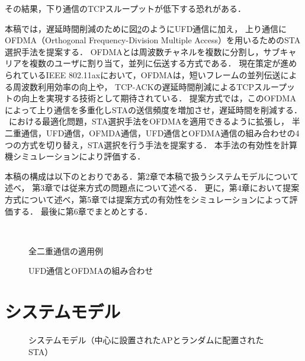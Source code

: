 \documentclass[technicalreport]{ieicej}
\begin{document}
	その結果，下り通信のTCPスループットが低下する恐れがある．
	\par
	本稿では，遅延時間削減のために図\ref{fig:ofdma}のようにUFD通信に加え，
	上り通信にOFDMA（Orthogonal Frequency-Division Multiple Access）を用いるためのSTA選択手法を提案する．
	OFDMAとは周波数チャネルを複数に分割し，サブキャリアを複数のユーザに割り当て，並列に伝送する方式である．
	現在策定が進められているIEEE 802.11axにおいて，OFDMAは，短いフレームの並列伝送による周波数利用効率の向上や，
	TCP-ACKの遅延時間削減によるTCPスループットの向上を実現する技術として期待されている．
	提案方式では，このOFDMAによって上り通信を多重化しSTAの送信頻度を増加させ，遅延時間を削減する．
	~\cite{promac_fair}における最適化問題，STA選択手法をOFDMAを適用できるように拡張し，
	半二重通信，UFD通信，OFMDA通信，UFD通信とOFDMA通信の組み合わせの4つの方式を切り替え，STA選択を行う手法を提案する．
	本手法の有効性を計算機シミュレーションにより評価する．
	\par
	本稿の構成は以下のとおりである．第2章で本稿で扱うシステムモデルについて述べ，
	第3章では従来方式の問題点について述べる．
	更に，第4章において提案方式について述べ，第5章では提案方式の有効性をシミュレーションによって評価する．
	最後に第6章でまとめとする．

	\begin{figure}[t]
		\centering
		\\
		\caption{全二重通信の適用例}
		\label{fig:topology}
	\end{figure}

	\begin{figure}[t]
		\centering
		\caption{UFD通信とOFDMAの組み合わせ}
		\label{fig:ofdma}
	\end{figure}

\section{システムモデル}\label{seq:system}
	\begin{figure}[t]
		\centering
		\caption{システムモデル（中心に設置されたAPとランダムに配置されたSTA）}
		\label{fig:model}
	\end{figure}
\end{document}
